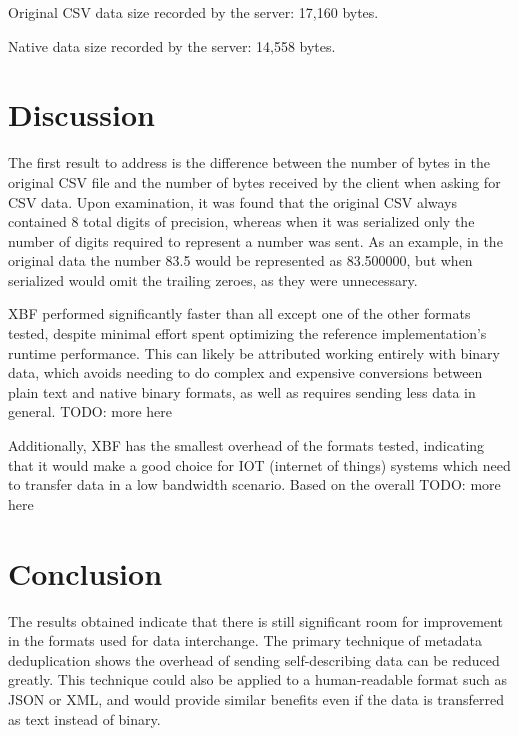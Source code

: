 \documentclass[conference]{IEEEtran}
\begin{document}
Original CSV data size recorded by the server: 17,160 bytes.

Native data size recorded by the server: 14,558 bytes.

\section{Discussion}

The first result to address is the difference between the number of bytes in the original CSV file and the number of bytes received by the client when asking for CSV data. Upon examination, it was found that the original CSV always contained 8 total digits of precision, whereas when it was serialized only the number of digits required to represent a number was sent. As an example, in the original data the number 83.5 would be represented as 83.500000, but when serialized would omit the trailing zeroes, as they were unnecessary.

XBF performed significantly faster than all except one of the other formats tested, despite minimal effort spent optimizing the reference implementation's runtime performance. This can likely be attributed working entirely with binary data, which avoids needing to do complex and expensive conversions between plain text and native binary formats, as well as requires sending less data in general. TODO: more here

Additionally, XBF has the smallest overhead of the formats tested, indicating that it would make a good choice for IOT (internet of things) systems which need to transfer data in a low bandwidth scenario. Based on the overall TODO: more here

\section{Conclusion}

The results obtained indicate that there is still significant room for improvement in the formats used for data interchange. The primary technique of metadata deduplication shows the overhead of sending self-describing data can be reduced greatly. This technique could also be applied to a human-readable format such as JSON or XML, and would provide similar benefits even if the data is transferred as text instead of binary.



\end{document}
